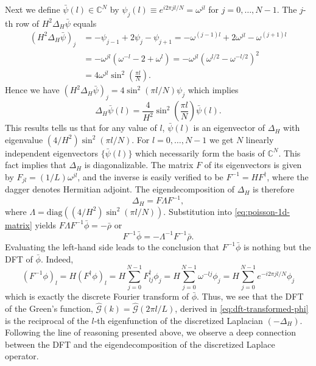 Next we define $\bar{\psi}(l) \in \mathbb{C}^N$ by $\psi_j(l) \equiv e^{i2\pi jl/N} = \omega^{jl}$ for $j=0,\dots,N-1$.
The $j$-th row of $H^2\Delta_H \bar{\psi}$ equals
\begin{align*}
    (H^2\Delta_H \bar{\psi})_j
     & = -\psi_{j-1} + 2\psi_j - \psi_{j+1}
    = -\omega^{(j-1)l} + 2\omega^{jl} - \omega^{(j+1)l}     \\
     & = -\omega^{jl}(\omega^{-l} - 2 + \omega^l)
    = -\omega^{jl}(\omega^{l/2} - \omega^{-l/2})^2          \\
     & = 4\omega^{jl} \sin^2\left( \frac{\pi l}{N} \right).
\end{align*}
Hence we have $(H^2\Delta_H \bar{\psi})_j = 4\sin^2(\pi l/N) \psi_j$ which implies
\begin{equation*}
    \Delta_H \bar{\psi}(l)
    = \frac{4}{H^2} \sin^2\left( \frac{\pi l}{N} \right) \bar{\psi}(l).
\end{equation*}
This results tells us that for any value of $l$, $\bar{\psi}(l)$ is an eigenvector of $\Delta_H$ with eigenvalue $(4/H^2)\sin^2(\pi l/N)$.
For $l=0,\dots, N-1$ we get $N$ linearly independent eigenvectors $\{\bar{\psi}(l)\}$ which necessarily form the basis of $\mathbb{C}^N$.
This fact implies that $\Delta_H$ is diagonalizable.
The matrix $F$ of its eigenvectors is given by $F_{jl} = (1/L) \omega^{jl}$, and the inverse is easily verified to be $F^{-1} = H F^\dagger$, where the dagger denotes Hermitian adjoint.
The eigendecomposition of $\Delta_H$ is therefore
\begin{equation*}
    \Delta_H = F\Lambda F^{-1},
\end{equation*}
where $\Lambda = \text{diag}((4/H^2)\sin^2(\pi l/N))$.
Substitution into \autoref{eq:poisson-1d-matrix} yields $F\Lambda F^{-1} \bar{\phi} = -\bar{\rho}$ or
\begin{equation*}
    F^{-1}\bar{\phi} = -\Lambda^{-1}F^{-1}\bar{\rho}.
\end{equation*}
Evaluating the left-hand side leads to the conclusion that $F^{-1}\bar\phi$ is nothing but the DFT of $\bar\phi$.
Indeed,
\begin{equation*}
    (F^{-1}\phi)_l
    = H (F^\dagger \phi)_l
    = H \sum_{j=0}^{N-1}F^\dagger_{lj}\phi_j
    = H \sum_{j=0}^{N-1}\omega^{-lj}\phi_j
    = H \sum_{j=0}^{N-1}e^{-i2\pi jl / N}\phi_j
\end{equation*}
which is exactly the discrete Fourier transform of $\bar\phi$.
Thus, we see that the DFT of the Green's function, $\hat{\mathcal{G}}(k) = \hat{\mathcal{G}}(2\pi l / L)$, derived in \autoref{eq:dft-transformed-phi} is the reciprocal of the $l$-th eigenfunction of the discretized Laplacian $(-\Delta_H)$.
Following the line of reasoning presented above, we observe a deep connection between the DFT and the eigendecomposition of the discretized Laplace operator.

